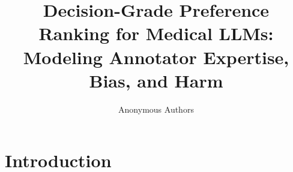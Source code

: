 \documentclass[11pt]{article}
\title{Decision-Grade Preference Ranking for Medical LLMs: Modeling Annotator Expertise, Bias, and Harm}
\author{Anonymous Authors}
\date{}
\begin{document}
\maketitle



\section{Introduction}
%

% 
%
% 
%
% 
%
% 
%
% 
%
% 
%
% 
%
% 
% 
%
\end{document}
